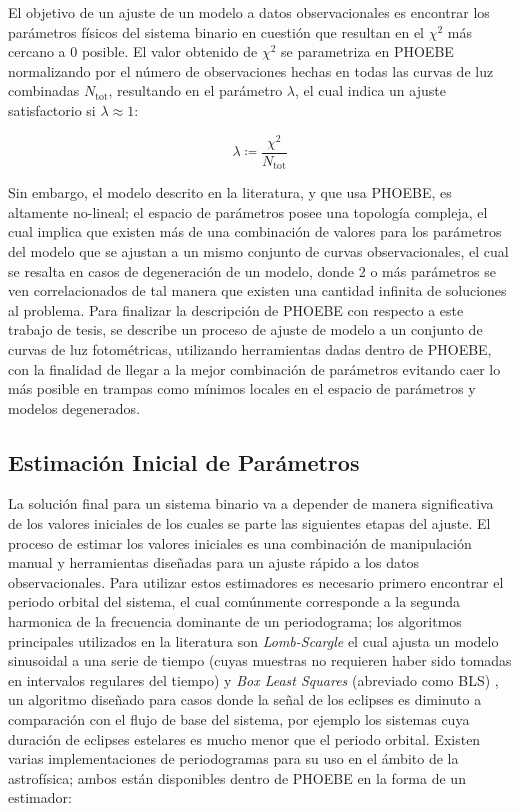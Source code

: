 El objetivo de un ajuste de un modelo a datos observacionales es encontrar los
parámetros físicos del sistema binario en cuestión que resultan en el $\chi^{2}$
más cercano a 0 posible. El valor obtenido de $\chi^2$ se parametriza en PHOEBE
normalizando por el número de observaciones hechas en todas las curvas de luz
combinadas $N_{\mathrm{tot}}$, resultando en el parámetro $\lambda$, el cual
indica un ajuste satisfactorio si $\lambda \approx 1$:

\begin{eqfloat}
	\centering
	\begin{equation}
		\lambda \coloneq \frac{\chi^2}{N_{\textrm{tot}}}
	\end{equation}
\end{eqfloat}

Sin embargo, el modelo descrito en la literatura, y que
usa PHOEBE, es altamente no-lineal; el espacio de parámetros posee una topología
compleja, el cual implica que existen más de una combinación de valores para los
parámetros del modelo que se ajustan a un mismo conjunto de curvas
observacionales, el cual se resalta en casos de degeneración de un modelo, donde
2 o más parámetros se ven correlacionados de tal manera que existen una cantidad
infinita de soluciones al problema. Para finalizar la descripción de PHOEBE con
respecto a este trabajo de tesis, se describe un proceso de ajuste de modelo a
un conjunto de curvas de luz fotométricas, utilizando herramientas dadas dentro
de PHOEBE, con la finalidad de llegar a la mejor combinación de parámetros
evitando caer lo más posible en trampas como mínimos locales en el espacio de
parámetros y modelos degenerados.

\subsection{Estimación Inicial de Parámetros}

La solución final para un sistema binario va a depender de manera significativa
de los valores iniciales de los cuales se parte las siguientes etapas del
ajuste. El proceso de estimar los valores iniciales es una combinación de
manipulación manual y herramientas diseñadas para un ajuste rápido a los datos
observacionales. Para utilizar estos estimadores es necesario primero encontrar
el periodo orbital del sistema, el cual comúnmente corresponde a la segunda
harmonica de la frecuencia dominante de un periodograma; los algoritmos
principales utilizados en la literatura son \textit{Lomb-Scargle}
 el cual ajusta
un modelo sinusoidal a una serie de tiempo (cuyas muestras no requieren haber
sido tomadas en intervalos regulares del tiempo) y \textit{Box Least Squares}
(abreviado como BLS) ,
un algoritmo diseñado para casos donde la señal de los eclipses es diminuto a
comparación con el flujo de base del sistema, por ejemplo los sistemas cuya
duración de eclipses estelares es mucho menor que el periodo orbital. Existen
varias implementaciones de periodogramas para su uso en el ámbito de la
astrofísica; ambos están disponibles dentro de PHOEBE en la forma de un
estimador:

